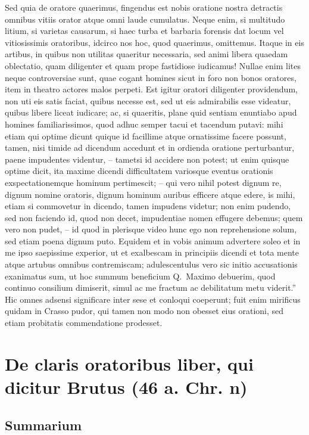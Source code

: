 Sed quia de oratore quaerimus, fingendus est nobis oratione nostra detractis omnibus vitiis orator atque omni laude cumulatus. Neque enim, si multitudo litium, si varietas causarum, si haec turba et barbaria forensis dat locum vel vitiosissimis oratoribus, idcirco nos hoc, quod quaerimus, omittemus. Itaque in eis artibus, in quibus non utilitas quaeritur necessaria, sed animi libera quaedam oblectatio, quam diligenter et quam prope fastidiose iudicamus! Nullae enim lites neque controversiae sunt, quae cogant homines sicut in foro non bonos oratores, item in theatro actores malos perpeti. Est igitur oratori diligenter providendum, non uti eis satis faciat, quibus necesse est, sed ut eis admirabilis esse videatur, quibus libere liceat iudicare; ac, si quaeritis, plane quid sentiam enuntiabo apud homines familiarissimos, quod adhuc semper tacui et tacendum putavi: mihi etiam qui optime dicunt quique id facillime atque ornatissime facere possunt, tamen, nisi timide ad dicendum accedunt et in ordienda oratione perturbantur, paene impudentes videntur, – tametsi id accidere non potest; ut enim quisque optime dicit, ita maxime dicendi difficultatem variosque eventus orationis exspectationemque hominum pertimescit; – qui vero nihil potest dignum re, dignum nomine oratoris, dignum hominum auribus efficere atque edere, is mihi, etiam si commovetur in dicendo, tamen impudens videtur; non enim pudendo, sed non faciendo id, quod non decet, impudentiae nomen effugere debemus;  quem vero non pudet, – id quod in plerisque video hunc ego non reprehensione solum, sed etiam poena dignum puto. Equidem et in vobis animum advertere soleo et in me ipso saepissime experior, ut et exalbescam in principiis dicendi et tota mente atque artubus omnibus contremiscam; adulescentulus vero sic initio accusationis exanimatus sum, ut hoc summum beneficium Q.~Maximo debuerim, quod continuo consilium dimiserit, simul ac me fractum ac debilitatum metu viderit.'' Hic omnes adsensi significare inter sese et conloqui coeperunt; fuit enim mirificus quidam in Crasso pudor, qui tamen non modo non obesset eius orationi, sed etiam probitatis commendatione prodesset.

\section*{De claris oratoribus liber, qui dicitur Brutus (46 a. Chr. n)}

\subsection*{Summarium}

